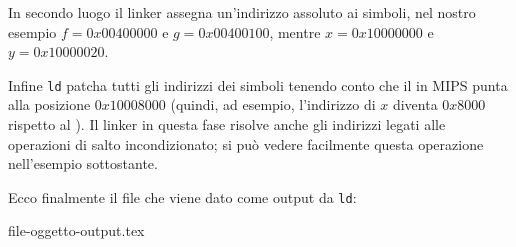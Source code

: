 \documentclass[class=book, crop=false, oneside]{standalone}
\begin{document}
In secondo luogo il linker assegna un'indirizzo assoluto ai simboli, nel nostro esempio \(f=0x00400000\) e \(g=0x00400100\), mentre \(x=0x10000000\) e \(y=0x10000020\).

Infine \texttt{ld} patcha tutti gli indirizzi dei simboli tenendo conto che il  in MIPS punta alla posizione \(0x10008000\) (quindi, ad esempio, l'indirizzo di \(x\) diventa \(0x8000\) rispetto al ). Il linker in questa fase risolve anche gli indirizzi legati alle operazioni di salto incondizionato; si può vedere facilmente questa operazione nell'esempio sottostante.

Ecco finalmente il file che viene dato come output da \texttt{ld}:
\begin{table}[H]
	{file-oggetto-output.tex}
	\caption{File di output}
\end{table}
\end{document}
